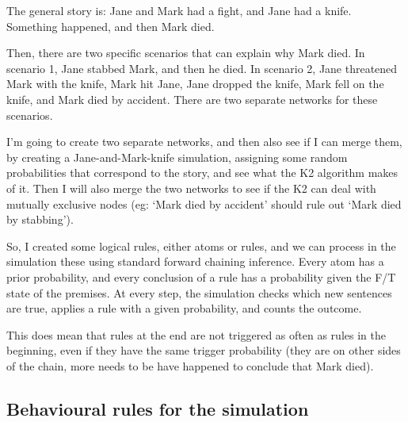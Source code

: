 The general story is: Jane and Mark had a fight, and Jane had a knife. Something happened, and then Mark died. 

Then, there are two specific scenarios that can explain why Mark died. In scenario 1, Jane stabbed Mark, and then he died. In scenario 2, Jane threatened Mark with the knife, Mark hit Jane, Jane dropped the knife, Mark fell on the knife, and Mark died by accident. There are two separate networks for these scenarios.

I'm going to create two separate networks, and then also see if I can merge them, by creating a Jane-and-Mark-knife simulation, assigning some random probabilities that correspond to the story, and see what the K2 algorithm makes of it. Then I will also merge the two networks to see if the K2 can deal with mutually exclusive nodes (eg: `Mark died by accident' should rule out `Mark died by stabbing').

So, I created some logical rules, either atoms or rules, and we can process in the simulation these using standard forward chaining inference. Every atom has a prior probability, and every conclusion of a rule has a probability given the F/T state of the premises. At every step, the simulation checks which new sentences are true, applies a rule with a given probability, and counts the outcome.

This does mean that rules at the end are not triggered as often as rules in the beginning, even if they have the same trigger probability (they are on other sides of the chain, more needs to be have happened to conclude that Mark died).

\subsection{Behavioural rules for the simulation}

